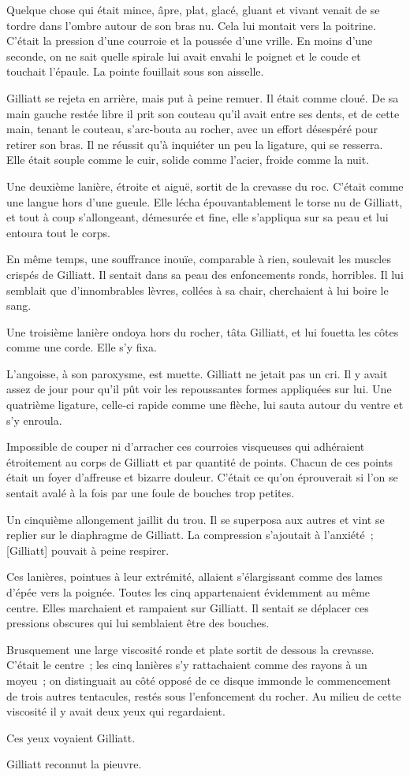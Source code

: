 \documentclass[french,twoside]{book} %
\newcommand\corr[1]{#1}
\begin{document}
Quelque chose qui était mince, âpre, plat, glacé,  gluant et vivant venait de se tordre dans l’ombre autour de son bras nu. Cela lui montait vers la poitrine. C’était la pression d’une courroie et la poussée d’une vrille. En moins d’une seconde, on ne sait quelle spirale lui avait envahi le poignet et le coude et touchait l’épaule. La pointe fouillait sous son aisselle.\par
Gilliatt se rejeta en arrière, mais put à peine remuer. Il était comme cloué. De sa main gauche restée libre il prit son couteau qu’il avait entre ses dents, et de cette main, tenant le couteau, s’arc-bouta au rocher, avec un effort désespéré pour retirer son bras. Il ne réussit qu’à inquiéter un peu la ligature, qui se resserra. Elle était souple comme le cuir, solide comme l’acier, froide comme la nuit.\par
Une deuxième lanière, étroite et aiguë, sortit de la crevasse du roc. C’était comme une langue hors d’une gueule. Elle lécha épouvantablement le torse nu de Gilliatt, et tout à coup s’allongeant, démesurée et fine, elle s’appliqua sur sa peau et lui entoura tout le corps.\par
En même temps, une souffrance inouïe, comparable à rien, soulevait les muscles crispés de Gilliatt. Il sentait dans sa peau des enfoncements ronds, horribles. Il lui semblait que d’innombrables lèvres, collées à sa chair, cherchaient à lui boire le sang.\par
Une troisième lanière ondoya hors du rocher, tâta Gilliatt, et lui fouetta les côtes comme une corde. Elle s’y fixa.\par
L’angoisse, à son paroxysme, est muette. Gilliatt ne jetait pas un cri. Il y avait assez de jour pour qu’il pût voir les repoussantes formes appliquées sur lui.  Une quatrième ligature, celle-ci rapide comme une flèche, lui sauta autour du ventre et s’y enroula.\par
Impossible de couper ni d’arracher ces courroies visqueuses qui adhéraient étroitement au corps de Gilliatt et par quantité de points. Chacun de ces points était un foyer d’affreuse et bizarre douleur. C’était ce qu’on éprouverait si l’on se sentait avalé à la fois par une foule de bouches trop petites.\par
Un cinquième allongement jaillit du trou. Il se superposa aux autres et vint se replier sur le diaphragme de Gilliatt. La compression s’ajoutait à l’anxiété ; [{\corr Gilliatt}] pouvait à peine respirer.\par
Ces lanières, pointues à leur extrémité, allaient s’élargissant comme des lames d’épée vers la poignée. Toutes les cinq appartenaient évidemment au même centre. Elles marchaient et rampaient sur Gilliatt. Il sentait se déplacer ces pressions obscures qui lui semblaient être des bouches.\par
Brusquement une large viscosité ronde et plate sortit de dessous la crevasse. C’était le centre ; les cinq lanières s’y rattachaient comme des rayons à un moyeu ; on distinguait au côté opposé de ce disque immonde le commencement de trois autres tentacules, restés sous l’enfoncement du rocher. Au milieu de cette viscosité il y avait deux yeux qui regardaient.\par
Ces yeux voyaient Gilliatt.\par
Gilliatt reconnut la pieuvre.
\end{document}
